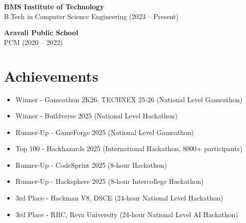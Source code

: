 \documentclass[10pt,a4paper]{article}
\begin{document}
\textbf{BMS Institute of Technology} \\
B.Tech in Computer Science Engineering (2023 -- Present)

\textbf{Aravali Public School} \\
PCM (2020 -- 2022)

\section*{Achievements}
\begin{itemize}
\item Winner - Gameathon 2K26, TECHNEX 25-26 (National Level Gameathon)
\item Winner - Buildverse 2025 (National Level Hackathon)
\item Runner-Up - GameForge 2025 (National Level Gameathon)
\item Top 100 - Hackhazards 2025 (International Hackathon, 8000+ participants)
\item Runner-Up - CodeSprint 2025 (8-hour Hackathon)
\item Runner-Up - Hacksphere 2025 (8-hour Intercollege Hackathon)
\item 3rd Place - Hackman V8, DSCE (24-hour National Level Hackathon)
\item 3rd Place - RRC, Reva University (24-hour National Level AI Hackathon)
\end{itemize}
\end{document}
